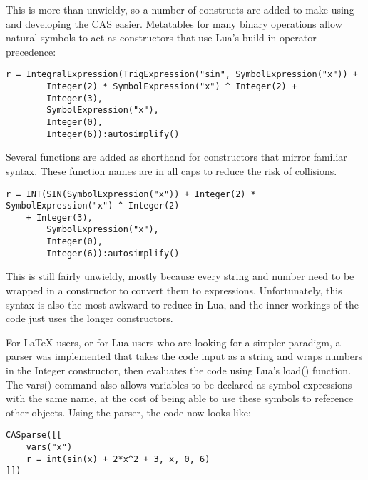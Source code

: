 \documentclass{article}
\begin{document}
This is more than unwieldy, so a number of constructs are added to make using and developing the CAS easier. Metatables for many binary operations allow natural symbols to act as constructors that use Lua's build-in operator precedence:

\begin{verbatim}
r = IntegralExpression(TrigExpression("sin", SymbolExpression("x")) +
        Integer(2) * SymbolExpression("x") ^ Integer(2) +
        Integer(3),
        SymbolExpression("x"),
        Integer(0),
        Integer(6)):autosimplify()
\end{verbatim}

Several functions are added as shorthand for constructors that mirror familiar syntax. These function names are in all caps to reduce the risk of collisions.

\begin{verbatim}
r = INT(SIN(SymbolExpression("x")) + Integer(2) * SymbolExpression("x") ^ Integer(2) 
    + Integer(3),
        SymbolExpression("x"),
        Integer(0),
        Integer(6)):autosimplify()
\end{verbatim}

This is still fairly unwieldy, mostly because every string and number need to be wrapped in a constructor to convert them to expressions. Unfortunately, this syntax is also the most awkward to reduce in Lua, and the inner workings of the code just uses the longer constructors.

For \LaTeX{} users, or for Lua users who are looking for a simpler paradigm, a parser was implemented that takes the code input as a string and wraps numbers in the {\ttfamily Integer} constructor, then evaluates the code using Lua's {\ttfamily load()} function. The {\ttfamily vars()} command also allows variables to be declared as symbol expressions with the same name, at the cost of being able to use these symbols to reference other objects. Using the parser, the code now looks like:

\begin{verbatim}
CASparse([[
    vars("x")
    r = int(sin(x) + 2*x^2 + 3, x, 0, 6)
]])
\end{verbatim}

\newpage

\printbibliography
\end{document}

